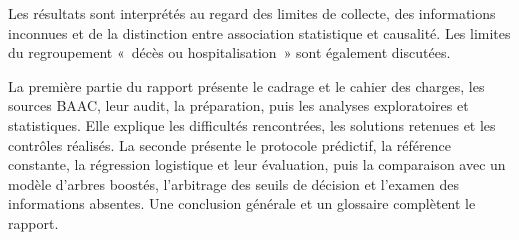 Les résultats sont interprétés au regard des limites de collecte, des informations
inconnues et de la distinction entre association statistique et causalité. Les limites
du regroupement «~décès ou hospitalisation~» sont également discutées.

La première partie du rapport présente le cadrage et le cahier des charges, les sources
BAAC, leur audit, la préparation, puis les analyses exploratoires et statistiques.
Elle explique les difficultés rencontrées, les solutions retenues et les contrôles
réalisés. La seconde présente le protocole prédictif, la référence constante, la régression
logistique et leur évaluation, puis la comparaison avec un modèle d'arbres boostés,
l'arbitrage des seuils de décision et l'examen des informations absentes. Une conclusion
générale et un glossaire complètent le rapport.
